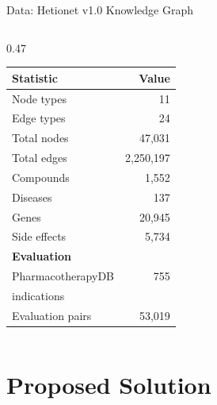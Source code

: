 \documentclass[aspectratio=169,11pt]{beamer}
\begin{document}
\begin{frame}{Data: Hetionet v1.0 Knowledge Graph}
\begin{columns}[T]
\begin{column}{0.47\textwidth}
\begin{table}
\centering
\begin{tabular}{lr}
\toprule
\textbf{Statistic} & \textbf{Value} \\
\midrule
Node types & 11 \\
Edge types & 24 \\
Total nodes & 47,031 \\
Total edges & 2,250,197 \\
\midrule
Compounds & 1,552 \\
Diseases & 137 \\
Genes & 20,945 \\
Side effects & 5,734 \\
\midrule
\multicolumn{2}{l}{\textbf{Evaluation}} \\
PharmacotherapyDB & 755 \\
\quad indications & \\
Evaluation pairs & 53,019 \\
\bottomrule
\end{tabular}
\end{table}

\end{column}
\end{columns}

\end{frame}

\section{Proposed Solution}
\end{document}
